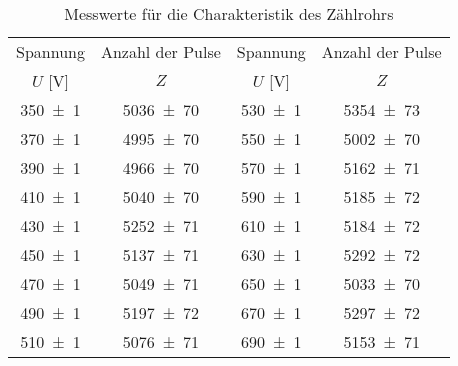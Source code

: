 \begin{table}[!h]
	\centering
	\begin{tabular}{|c|c||c|c|}
		\hline
		Spannung & Anzahl der Pulse & Spannung & Anzahl der Pulse\\
		$U$ [\si{\volt}] & $Z$ & $U$ [\si{\volt}] & $Z$ \\
\hline\hline
		\num{350(1)} & \num{5036(70)} & \num{530(1)} & \num{5354(73)}\\
		\num{370(1)} & \num{4995(70)} & \num{550(1)} & \num{5002(70)}\\
		\num{390(1)} & \num{4966(70)} & \num{570(1)} & \num{5162(71)}\\
		\num{410(1)} & \num{5040(70)} & \num{590(1)} & \num{5185(72)}\\
		\num{430(1)} & \num{5252(71)} & \num{610(1)} & \num{5184(72)}\\
		\num{450(1)} & \num{5137(71)} & \num{630(1)} & \num{5292(72)}\\
		\num{470(1)} & \num{5049(71)} & \num{650(1)} & \num{5033(70)}\\
		\num{490(1)} & \num{5197(72)} & \num{670(1)} & \num{5297(72)}\\
		\num{510(1)} & \num{5076(71)} & \num{690(1)} & \num{5153(71)}\\
		\hline
	\end{tabular}
	\caption{Messwerte für die Charakteristik des Zählrohrs \label{tab:Auswertung_Charakteristik}}
\end{table}
